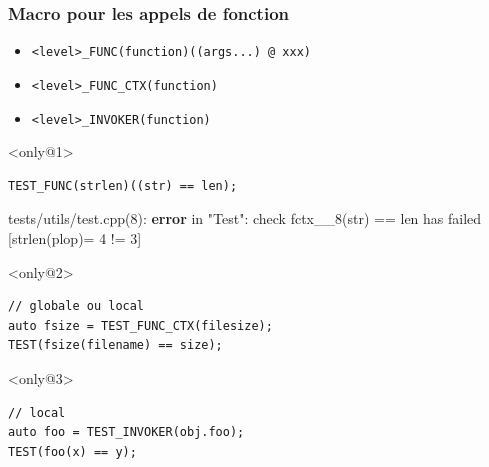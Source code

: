 \documentclass{beamer}
\begin{document}
\begin{frame}[fragile]
\frametitle{Macro pour les appels de fonction}
\begin{itemize}[<+->]
 \item \lstinline|<level>_FUNC(function)((args...) @ xxx)|
 \item \lstinline|<level>_FUNC_CTX(function)|
 \item \lstinline|<level>_INVOKER(function)|
\end{itemize}

\begin{exampleblock}{}<only@1>
\begin{lstlisting}
TEST_FUNC(strlen)((str) == len);
\end{lstlisting}
{\color{f7}tests/utils/test.cpp(8)}: \textbf{\color{f1}error} in "{\color{f5}Test}":
 {\color{f4}check} {\color{f1}fctx\_\_8(str)} {\color{f3}==} {\color{f1}len has} failed [{\color{f6}strlen(plop)= 4} {\color{f3}!=} {\color{f6}3}]
\end{exampleblock}

\begin{exampleblock}{}<only@2>
\begin{lstlisting}
// globale ou local
auto fsize = TEST_FUNC_CTX(filesize);
TEST(fsize(filename) == size);
\end{lstlisting}
\end{exampleblock}

\begin{exampleblock}{}<only@3>
\begin{lstlisting}
// local
auto foo = TEST_INVOKER(obj.foo);
TEST(foo(x) == y);
\end{lstlisting}
\end{exampleblock}
\end{frame}
\end{document}
